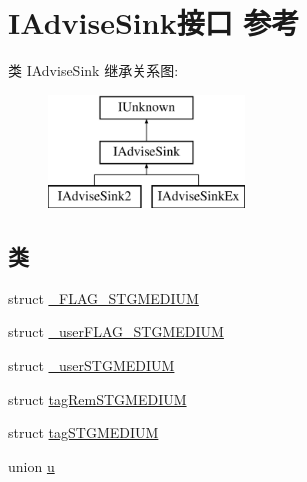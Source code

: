 \hypertarget{interface_i_advise_sink}{}\section{I\+Advise\+Sink接口 参考}
\label{interface_i_advise_sink}
类 I\+Advise\+Sink 继承关系图\+:\begin{figure}[H]
\begin{center}
\leavevmode
\includegraphics[height=3.000000cm]{interface_i_advise_sink}
\end{center}
\end{figure}
\subsection*{类}
\begin{DoxyCompactItemize}
\item 
struct \hyperlink{struct_i_advise_sink_1_1___f_l_a_g___s_t_g_m_e_d_i_u_m}{\+\_\+\+F\+L\+A\+G\+\_\+\+S\+T\+G\+M\+E\+D\+I\+UM}
\item 
struct \hyperlink{struct_i_advise_sink_1_1__user_f_l_a_g___s_t_g_m_e_d_i_u_m}{\+\_\+user\+F\+L\+A\+G\+\_\+\+S\+T\+G\+M\+E\+D\+I\+UM}
\item 
struct \hyperlink{struct_i_advise_sink_1_1__user_s_t_g_m_e_d_i_u_m}{\+\_\+user\+S\+T\+G\+M\+E\+D\+I\+UM}
\item 
struct \hyperlink{struct_i_advise_sink_1_1tag_rem_s_t_g_m_e_d_i_u_m}{tag\+Rem\+S\+T\+G\+M\+E\+D\+I\+UM}
\item 
struct \hyperlink{struct_i_advise_sink_1_1tag_s_t_g_m_e_d_i_u_m}{tag\+S\+T\+G\+M\+E\+D\+I\+UM}
\item 
union \hyperlink{union_i_advise_sink_1_1u}{u}
\end{DoxyCompactItemize}
